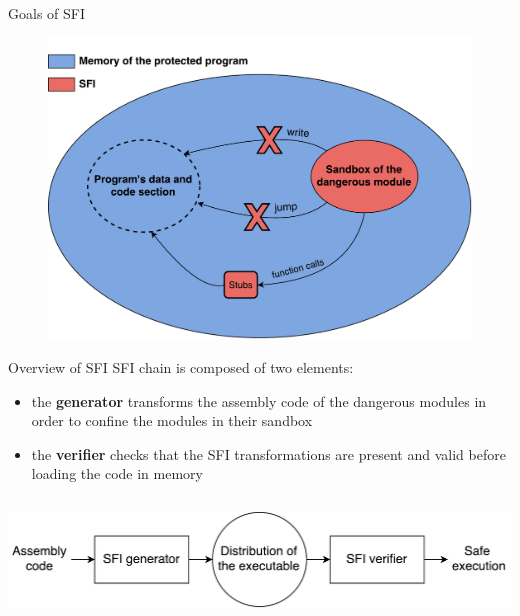 \documentclass{beamer}
\begin{document}
\begin{frame}[c]{Goals of SFI}
\begin{figure}
\centering
\includegraphics[width=1\textwidth]{images/sfi_principle.pdf}
\end{figure}

\end{frame}

\begin{frame}{Overview of SFI} %
	SFI chain is composed of two elements:
		\begin{itemize}
			\item the \textbf{generator} transforms the assembly code of the dangerous modules in order to confine the modules in their sandbox
			\item the \textbf{verifier} checks that the SFI transformations are present and valid before loading the code in memory
		\end{itemize}
		\vspace{5mm}
		\begin{columns}
			\column{\dimexpr\paperwidth-10pt}
			\begin{center}
			\includegraphics[width=0.95\paperwidth]{images/sfi_chain.pdf}
			\end{center}
		\end{columns}
\end{frame}
\end{document}
